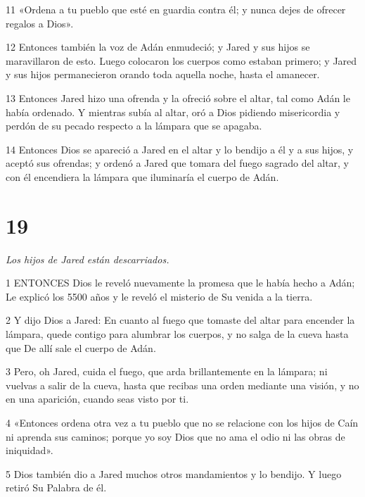 \par 11 «Ordena a tu pueblo que esté en guardia contra él; y nunca dejes de ofrecer regalos a Dios».

\par 12 Entonces también la voz de Adán enmudeció; y Jared y sus hijos se maravillaron de esto. Luego colocaron los cuerpos como estaban primero; y Jared y sus hijos permanecieron orando toda aquella noche, hasta el amanecer.

\par 13 Entonces Jared hizo una ofrenda y la ofreció sobre el altar, tal como Adán le había ordenado. Y mientras subía al altar, oró a Dios pidiendo misericordia y perdón de su pecado respecto a la lámpara que se apagaba.

\par 14 Entonces Dios se apareció a Jared en el altar y lo bendijo a él y a sus hijos, y aceptó sus ofrendas; y ordenó a Jared que tomara del fuego sagrado del altar, y con él encendiera la lámpara que iluminaría el cuerpo de Adán.

\chapter{19}

\par \textit{Los hijos de Jared están descarriados.}

\par 1 ENTONCES Dios le reveló nuevamente la promesa que le había hecho a Adán; Le explicó los 5500 años y le reveló el misterio de Su venida a la tierra.

\par 2 Y dijo Dios a Jared: En cuanto al fuego que tomaste del altar para encender la lámpara, quede contigo para alumbrar los cuerpos, y no salga de la cueva hasta que De allí sale el cuerpo de Adán.

\par 3 Pero, oh Jared, cuida el fuego, que arda brillantemente en la lámpara; ni vuelvas a salir de la cueva, hasta que recibas una orden mediante una visión, y no en una aparición, cuando seas visto por ti.

\par 4 «Entonces ordena otra vez a tu pueblo que no se relacione con los hijos de Caín ni aprenda sus caminos; porque yo soy Dios que no ama el odio ni las obras de iniquidad».

\par 5 Dios también dio a Jared muchos otros mandamientos y lo bendijo. Y luego retiró Su Palabra de él.

